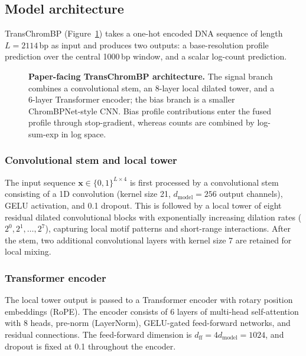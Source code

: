 \documentclass[11pt,a4paper]{article}
\begin{document}
\subsection{Model architecture}
\label{sec:arch}

TransChromBP (Figure~\ref{fig:arch})
takes a one-hot encoded DNA sequence of length $L = 2114$\,bp as input
and produces two outputs: a base-resolution profile prediction over the
central 1000\,bp window, and a scalar log-count prediction.

\begin{figure}[H]
\centering
\resizebox{\textwidth}{!}{}
\caption{\textbf{Paper-facing TransChromBP architecture.} The signal
branch combines a convolutional stem, an 8-layer local dilated tower,
and a 6-layer Transformer encoder; the bias branch is a smaller
ChromBPNet-style CNN. Bias profile contributions enter the fused profile
through stop-gradient, whereas counts are combined by log-sum-exp in log
space.}
\label{fig:arch}
\end{figure}

\subsubsection{Convolutional stem and local tower}

The input sequence $\mathbf{x} \in \{0,1\}^{L \times 4}$ is first
processed by a convolutional stem consisting of a 1D convolution
(kernel size 21, $d_{\text{model}}=256$ output channels), GELU
activation, and 0.1 dropout. This is followed by a local tower of
eight residual dilated convolutional blocks with exponentially
increasing dilation rates ($2^0, 2^1, \ldots, 2^7$), capturing local
motif patterns and short-range interactions. After the stem, two
additional convolutional layers with kernel size 7 are retained for
local mixing.

\subsubsection{Transformer encoder}

The local tower output is passed to a Transformer encoder with
rotary position embeddings (RoPE). The encoder consists of 6 layers of
multi-head self-attention with 8 heads, pre-norm (LayerNorm),
GELU-gated feed-forward networks, and residual connections. The
feed-forward dimension is $d_{\text{ff}} = 4d_{\text{model}} = 1024$,
and dropout is fixed at 0.1 throughout the encoder.
\end{document}
